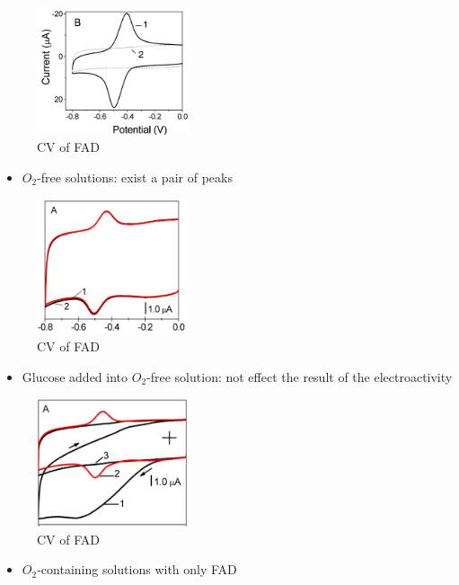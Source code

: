 \documentclass[fontsize=11pt,aspectratio=169,t,fleqn]{beamer}
\begin{document}
\begin{frame}
  \begin{figure}[h!]
    \centering
    
       \includegraphics[width=0.4\textwidth]{fig/FAD.png}
       \caption{CV of FAD}
    \end{figure}
    \begin{itemize}
      \item $O_2$-free solutions: exist a pair of peaks
      
    \end{itemize}
\end{frame}
\begin{frame}
  \begin{figure}[h!]
    \centering
    
       \includegraphics[width=0.4\textwidth]{fig/FADwithglucose.png}
       \caption{CV of FAD}
    \end{figure}
    \begin{itemize}
      \item Glucose added into $O_2$-free solution: not effect the
      result of the electroactivity 
      
    \end{itemize}
\end{frame}

\begin{frame}
  \begin{figure}[h!]
    \centering
    
       \includegraphics[width=0.4\textwidth]{fig/oxygewithfad.png}
       \caption{CV of FAD}
    \end{figure}
    \begin{itemize}
      \item $O_2$-containing solutions with only FAD
     \end{itemize}
\end{frame}
\end{document}
